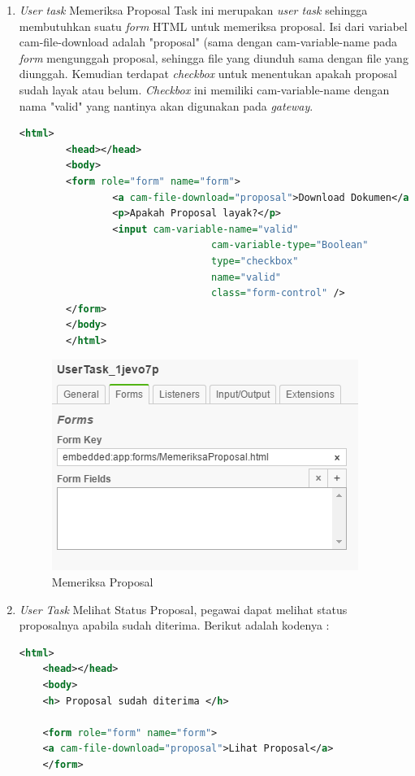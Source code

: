 \begin{enumerate}
\begin{enumerate}
\item \textit{User task} Memeriksa Proposal Task ini merupakan \textit{user task} sehingga membutuhkan suatu \textit{form} HTML untuk memeriksa proposal. Isi dari variabel cam-file-download adalah "proposal" (sama dengan cam-variable-name pada \textit{form} mengunggah proposal, sehingga file yang diunduh sama dengan file yang diunggah. Kemudian terdapat \textit{checkbox} untuk menentukan apakah proposal sudah layak atau belum. \textit{Checkbox} ini memiliki cam-variable-name dengan nama "valid" yang nantinya akan digunakan pada \textit{gateway}.

	
	\begin{lstlisting}[language=xml,basicstyle=\tiny,caption=MemeriksaProposal.html]
		<html>
		<head></head>
		<body>
		<form role="form" name="form">
				<a cam-file-download="proposal">Download Dokumen</a>
				<p>Apakah Proposal layak?</p>
				<input cam-variable-name="valid"
								 cam-variable-type="Boolean"
								 type="checkbox"
								 name="valid"
								 class="form-control" />		
		</form> 
		</body>
		</html>
	\end{lstlisting}
	
	\begin{figure}[H]
			\centering
			\includegraphics[scale=1]{Gambar/Bab-3/Kasus1/4form2}
			\caption{Memeriksa Proposal} 
			\label{fig:pengajuanproposal_memeriksaproposalhtml}
	\end{figure}

\item \textit{User Task} Melihat Status Proposal, pegawai dapat melihat status proposalnya apabila sudah diterima. Berikut adalah kodenya :
	\begin{lstlisting}[language=xml,basicstyle=\tiny,caption=MemeriksaProposal.html]
<html>
	<head></head>
	<body>
	<h> Proposal sudah diterima </h>
	
	<form role="form" name="form">
  	<a cam-file-download="proposal">Lihat Proposal</a>
  	</form>
	



\end{lstlisting}
\end{enumerate}
\end{enumerate}
